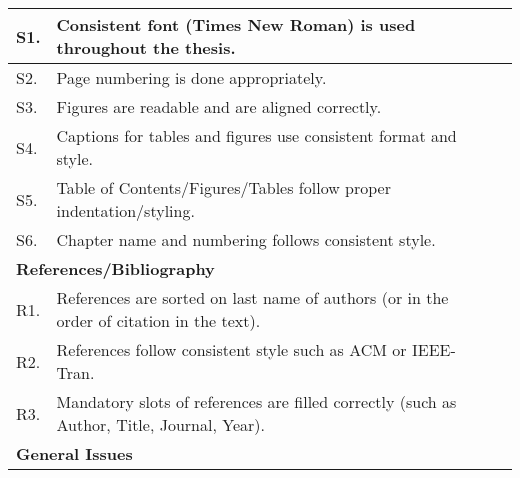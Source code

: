 \begin{table}[!ht]
\begin{adjustbox}{width=\linewidth,center}
\begin{tabular}{p{0.6cm}p{9cm}p{0.6cm}}
\multicolumn{1}{|l|}{S1.} & \multicolumn{1}{l|}{Consistent font (Times New Roman) is   used throughout the thesis.}                                              & \multicolumn{1}{l|}{} \\ \midrule
\multicolumn{1}{|l|}{S2.} & \multicolumn{1}{l|}{Page numbering is   done appropriately.}                                                                         & \multicolumn{1}{l|}{} \\ \midrule
\multicolumn{1}{|l|}{S3.} & \multicolumn{1}{l|}{Figures are readable   and are aligned correctly.}                                                               & \multicolumn{1}{l|}{} \\ \midrule
\multicolumn{1}{|l|}{S4.} & \multicolumn{1}{l|}{Captions for tables   and figures use consistent format and style.}                                              & \multicolumn{1}{l|}{} \\ \midrule
\multicolumn{1}{|l|}{S5.} & \multicolumn{1}{l|}{Table of   Contents/Figures/Tables follow proper indentation/styling.}                                           & \multicolumn{1}{l|}{} \\ \midrule
\multicolumn{1}{|l|}{S6.} & \multicolumn{1}{l|}{Chapter name and   numbering follows consistent style.}                                                          & \multicolumn{1}{l|}{} \\ \midrule
\multicolumn{3}{|l|}{\textbf{References/Bibliography}}                                                                                                                                   \\ \midrule
\multicolumn{1}{|l|}{R1.} & \multicolumn{1}{l|}{References are   sorted on last name of authors (or in the order of citation in the text).}                      & \multicolumn{1}{l|}{} \\ \midrule
\multicolumn{1}{|l|}{R2.} & \multicolumn{1}{l|}{References follow   consistent style such as ACM or IEEE-Tran.}                                                  & \multicolumn{1}{l|}{} \\ \midrule
\multicolumn{1}{|l|}{R3.} & \multicolumn{1}{l|}{Mandatory slots of   references are filled correctly (such as Author, Title, Journal, Year).}                    & \multicolumn{1}{l|}{} \\ \midrule
\multicolumn{3}{|l|}{\textbf{General Issues}}                                                                                                                                            \\ \midrule

\end{tabular}
\end{adjustbox}
\end{table}
